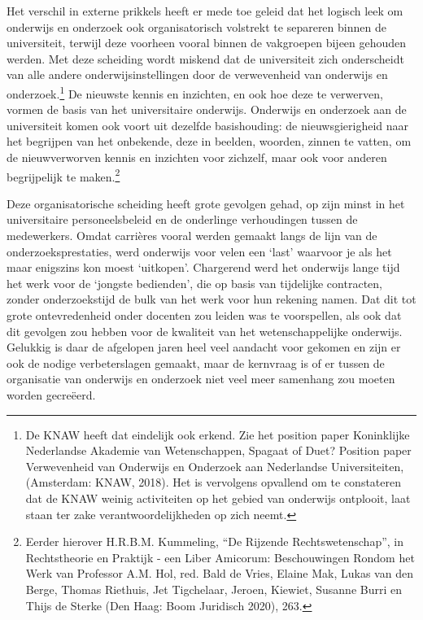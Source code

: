 \documentclass[empirical, authordate, ]{new-jote-article}
\begin{document}
	Het verschil in externe prikkels heeft er mede toe geleid dat het logisch leek om onderwijs en onderzoek ook organisatorisch volstrekt te separeren binnen de universiteit, terwijl deze voorheen vooral binnen de vakgroepen bijeen gehouden werden. Met deze scheiding wordt miskend dat de universiteit zich onderscheidt van alle andere onderwijsinstellingen door de verwevenheid van onderwijs en onderzoek.\footnote{De KNAW heeft dat eindelijk ook erkend. Zie het position paper Koninklijke Nederlandse Akademie van Wetenschappen, Spagaat of Duet? Position paper Verwevenheid van Onderwijs en Onderzoek aan Nederlandse Universiteiten, (Amsterdam: KNAW, 2018). Het is vervolgens opvallend om te constateren dat de KNAW weinig activiteiten op het gebied van onderwijs ontplooit, laat staan ter zake verantwoordelijkheden op zich neemt.} De nieuwste kennis en inzichten, en ook hoe deze te verwerven, vormen de basis van het universitaire onderwijs. Onderwijs en onderzoek aan de universiteit komen ook voort uit dezelfde basishouding: de nieuwsgierigheid naar het begrijpen van het onbekende, deze in beelden, woorden, zinnen te vatten, om de nieuwverworven kennis en inzichten voor zichzelf, maar ook voor anderen begrijpelijk te maken.\footnote{Eerder hierover H.R.B.M. Kummeling, “De Rijzende Rechtswetenschap”, in Rechtstheorie en Praktijk - een Liber Amicorum: Beschouwingen Rondom het Werk van Professor A.M. Hol, red. Bald de Vries, Elaine Mak, Lukas van den Berge, Thomas Riethuis, Jet Tigchelaar, Jeroen, Kiewiet, Susanne Burri en Thijs de Sterke (Den Haag: Boom Juridisch 2020), 263.}



	Deze organisatorische scheiding heeft grote gevolgen gehad, op zijn minst in het universitaire personeelsbeleid en de onderlinge verhoudingen tussen de medewerkers. Omdat carrières vooral werden gemaakt langs de lijn van de onderzoeksprestaties, werd onderwijs voor velen een ‘last' waarvoor je als het maar enigszins kon moest ‘uitkopen'. Chargerend werd het onderwijs lange tijd het werk voor de ‘jongste bedienden', die op basis van tijdelijke contracten, zonder onderzoekstijd de bulk van het werk voor hun rekening namen. Dat dit tot grote ontevredenheid onder docenten zou leiden was te voorspellen, als ook dat dit gevolgen zou hebben voor de kwaliteit van het wetenschappelijke onderwijs. Gelukkig is daar de afgelopen jaren heel veel aandacht voor gekomen en zijn er ook de nodige verbeterslagen gemaakt, maar de kernvraag is of er tussen de organisatie van onderwijs en onderzoek niet veel meer samenhang zou moeten worden gecreëerd.
\end{document}
